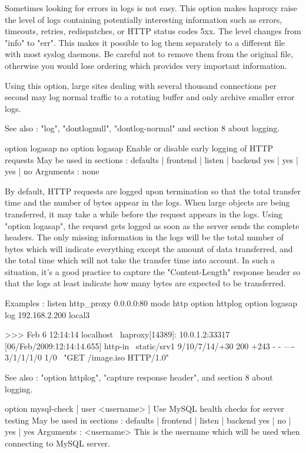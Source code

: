   Sometimes looking for errors in logs is not easy. This option makes haproxy
  raise the level of logs containing potentially interesting information such
  as errors, timeouts, retries, redispatches, or HTTP status codes 5xx. The
  level changes from "info" to "err". This makes it possible to log them
  separately to a different file with most syslog daemons. Be careful not to
  remove them from the original file, otherwise you would lose ordering which
  provides very important information.

  Using this option, large sites dealing with several thousand connections per
  second may log normal traffic to a rotating buffer and only archive smaller
  error logs.

  See also : "log", "dontlognull", "dontlog-normal" and section 8 about
             logging.


option logasap
no option logasap
  Enable or disable early logging of HTTP requests
  May be used in sections :   defaults | frontend | listen | backend
                                 yes   |    yes   |   yes  |   no
  Arguments : none

  By default, HTTP requests are logged upon termination so that the total
  transfer time and the number of bytes appear in the logs. When large objects
  are being transferred, it may take a while before the request appears in the
  logs. Using "option logasap", the request gets logged as soon as the server
  sends the complete headers. The only missing information in the logs will be
  the total number of bytes which will indicate everything except the amount
  of data transferred, and the total time which will not take the transfer
  time into account. In such a situation, it's a good practice to capture the
  "Content-Length" response header so that the logs at least indicate how many
  bytes are expected to be transferred.

  Examples :
      listen http_proxy 0.0.0.0:80
          mode http
          option httplog
          option logasap
          log 192.168.2.200 local3

    >>> Feb  6 12:14:14 localhost \
          haproxy[14389]: 10.0.1.2:33317 [06/Feb/2009:12:14:14.655] http-in \
          static/srv1 9/10/7/14/+30 200 +243 - - ---- 3/1/1/1/0 1/0 \
          "GET /image.iso HTTP/1.0"

  See also : "option httplog", "capture response header", and section 8 about
             logging.


option mysql-check [ user <username> ]
  Use MySQL health checks for server testing
  May be used in sections :   defaults | frontend | listen | backend
                                 yes   |    no    |   yes  |   yes
  Arguments :
    <username> This is the username which will be used when connecting to MySQL
               server.

